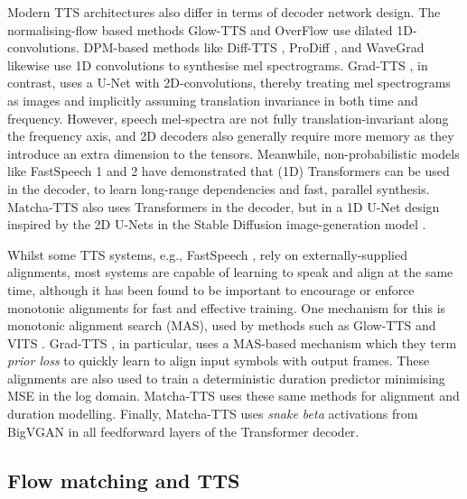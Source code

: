 \documentclass[british]{article}
\begin{document}
Modern TTS architectures also differ in terms of decoder network design.
The normalising-flow based methods Glow-TTS \cite{kim2020glow} and OverFlow \cite{mehta2023overflow} use dilated 1D-convolutions.
DPM-based methods like Diff-TTS \cite{jeong2021diff}, ProDiff \cite{huang2022prodiff}, and WaveGrad \cite{chen2021wavegrad} likewise use 1D convolutions to synthesise mel spectrograms.
Grad-TTS \cite{popov2021grad}, in contrast, 
uses a U-Net with 2D-convolutions, thereby treating mel spectrograms as images and implicitly assuming translation invariance in both time and frequency.
However, speech mel-spectra are not fully translation-invariant along the frequency axis, and 2D decoders also generally require more memory as they introduce an extra dimension to the tensors.
Meanwhile, non-probabilistic models like FastSpeech 1 and 2
have demonstrated that (1D) Transformers can be used in the decoder, to learn long-range dependencies and fast, parallel synthesis.
Matcha-TTS also uses Transformers in the decoder, but in a 1D U-Net design inspired by the 2D U-Nets in the Stable Diffusion image-generation model \cite{rombach2022high}.

Whilst some TTS systems, e.g., FastSpeech \cite{ren2019fastspeech}, rely on externally-supplied alignments, most systems are capable of learning to speak and align at the same time,
although it has been found to be important to encourage or enforce monotonic alignments
\cite{watts2019where,mehta2022neuralhmm}
for fast and effective training.
One mechanism for this is monotonic alignment search (MAS), used by methods such as Glow-TTS \cite{kim2020glow} and VITS \cite{kim2021vits}.
Grad-TTS \cite{popov2021grad}, in particular, uses a MAS-based mechanism
which they term \emph{prior loss} to quickly learn to align input symbols with output frames.
These alignments are also used to train a deterministic duration predictor minimising MSE in the log domain.
Matcha-TTS uses these same methods for alignment and duration modelling.
Finally, Matcha-TTS uses \emph{snake beta} activations from BigVGAN \cite{lee2023bigvgan}
in all feedforward layers of the Transformer decoder.














\subsection{Flow matching and TTS}
\end{document}
